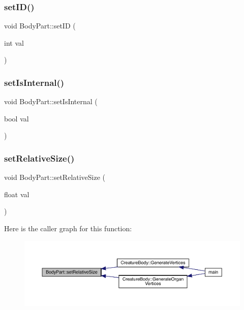 \mbox{\label{class_body_part_ac4d2365cc57317596096db2b56f52c91}} 
\subsubsection{\texorpdfstring{set\+I\+D()}{setID()}}
{\footnotesize\ttfamily void Body\+Part\+::set\+ID (\begin{DoxyParamCaption}\item[{int}]{val }\end{DoxyParamCaption})}

\mbox{\label{class_body_part_a6f1b8a920f6c5f7c7f32f51bbf721f6d}} 
\subsubsection{\texorpdfstring{set\+Is\+Internal()}{setIsInternal()}}
{\footnotesize\ttfamily void Body\+Part\+::set\+Is\+Internal (\begin{DoxyParamCaption}\item[{bool}]{val }\end{DoxyParamCaption})}

\mbox{\label{class_body_part_ab22b9412b4959e3a0a42efc79e409199}} 
\subsubsection{\texorpdfstring{set\+Relative\+Size()}{setRelativeSize()}}
{\footnotesize\ttfamily void Body\+Part\+::set\+Relative\+Size (\begin{DoxyParamCaption}\item[{float}]{val }\end{DoxyParamCaption})}

Here is the caller graph for this function\+:
\nopagebreak
\begin{figure}[H]
\begin{center}
\leavevmode
\includegraphics[width=350pt]{d2/d6f/class_body_part_ab22b9412b4959e3a0a42efc79e409199_icgraph}
\end{center}
\end{figure}
\mbox{\label{class_body_part_acae2236af2e131dfb8a49b4ca62d0d1f}} 
